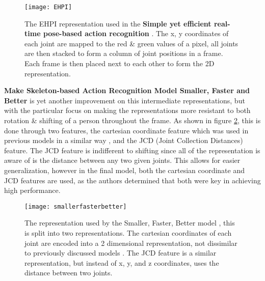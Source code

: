 \begin{figure}[ht]
	\texttt{[image: EHPI]}
	\centering
	\caption{The EHPI representation used in the \textbf{Simple yet efficient real-time pose-based action recognition} \cite{simple_yet_efficient}. The x, y coordinates of each joint are mapped to the red \& green values of a pixel, all joints are then stacked to form a column of joint positions in a frame. Each frame is then placed next to each other to form the 2D representation.}
	\label{fig:EHPI}
\end{figure}

\textbf{Make Skeleton-based Action Recognition Model Smaller, Faster and Better} \cite{smaller_faster_better} is yet another improvement on this intermediate representations, but with the particular focus on making the representations more resistant to both rotation \& shifting of a person throughout the frame.  As shown in figure \ref{fig:smallerfasterbetter}, this is done through two features, the cartesian coordinate feature which was used in previous models in a similar way \cite{simple_yet_efficient}, and the JCD (Joint Collection Distances) feature. The JCD feature is indifferent to shifting since all of the representation is aware of is the distance between any two given joints. This allows for easier generalization, however in the final model, both the cartesian coordinate and JCD features are used, as the authors determined that both were key in achieving high performance.

\begin{figure}[ht]
	\texttt{[image: smallerfasterbetter]}
	\centering
	\caption{The representation used by the Smaller, Faster, Better model \cite{smaller_faster_better}, this is split into two representations. The cartesian coordinates of each joint are encoded into a 2 dimensional representation, not dissimilar to previously discussed models \cite{simple_yet_efficient}. The JCD feature is a similar representation, but instead of x, y, and z coordinates, uses the distance between two joints.}
	\label{fig:smallerfasterbetter}
\end{figure}